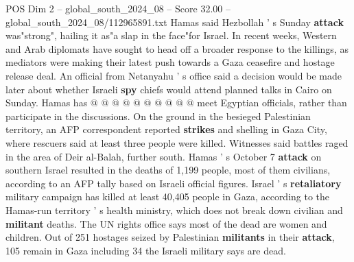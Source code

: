 \begin{textsample}{POS Dim 2 – global\_south\_2024\_08 – Score 32.00 – global\_south\_2024\_08/112965891.txt}
Hamas said Hezbollah ' s Sunday \textbf{attack} was"strong", hailing it as"a slap in the face"for Israel.
In recent weeks, Western and Arab diplomats have sought to head off a broader response to the killings, as mediators were making their latest push towards a Gaza ceasefire and hostage release deal.
An official from Netanyahu ' s office said a decision would be made later about whether Israeli \textbf{spy} chiefs would attend planned talks in Cairo on Sunday.
Hamas has @ @ @ @ @ @ @ @ @ @ meet Egyptian officials, rather than participate in the discussions.
On the ground in the besieged Palestinian territory, an AFP correspondent reported \textbf{strikes} and shelling in Gaza City, where rescuers said at least three people were killed.
Witnesses said battles raged in the area of Deir al-Balah, further south.
Hamas ' s October 7 \textbf{attack} on southern Israel resulted in the deaths of 1,199 people, most of them civilians, according to an AFP tally based on Israeli official figures.
Israel ' s \textbf{retaliatory} military campaign has killed at least 40,405 people in Gaza, according to the Hamas-run territory ' s health ministry, which does not break down civilian and \textbf{militant} deaths.
The UN rights office says most of the dead are women and children.
Out of 251 hostages seized by Palestinian \textbf{militants} in their \textbf{attack}, 105 remain in Gaza including 34 the Israeli military says are dead.

\end{textsample}
